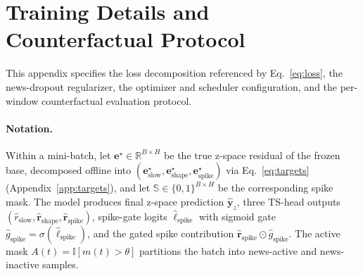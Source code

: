 \documentclass{article}
\begin{document}
\section{Training Details and Counterfactual Protocol}
\label{app:training}

This appendix specifies the loss decomposition referenced by Eq.~\ref{eq:loss}, the news-dropout regularizer, the optimizer and scheduler configuration, and the per-window counterfactual evaluation protocol.

\paragraph{Notation.}
Within a mini-batch, let $\bm{e}^{\star}\!\in\!\mathbb{R}^{B\times H}$ be the true z-space residual of the frozen base, decomposed offline into $(\bm{e}^{\star}_{\text{slow}},\bm{e}^{\star}_{\text{shape}},\bm{e}^{\star}_{\text{spike}})$ via Eq.~\ref{eq:targets} (Appendix~\ref{app:targets}), and let $\mathbb{S}\!\in\!\{0,1\}^{B\times H}$ be the corresponding spike mask. The model produces final z-space prediction $\hat{\bm{y}}_z$, three TS-head outputs $(\hat r_{\text{slow}},\hat{\bm{r}}_{\text{shape}},\hat{\bm{r}}_{\text{spike}})$, spike-gate logits $\hat{\bm{\ell}}_{\text{spike}}$ with sigmoid gate $\hat{g}_{\text{spike}}{=}\sigma(\hat{\bm{\ell}}_{\text{spike}})$, and the gated spike contribution $\hat{\bm{r}}_{\text{spike}}\odot\hat{g}_{\text{spike}}$.
The active mask $A(t)\!=\!\mathbb{I}[m(t)\!>\!\theta]$ partitions the batch into news-active and news-inactive samples.
\end{document}

